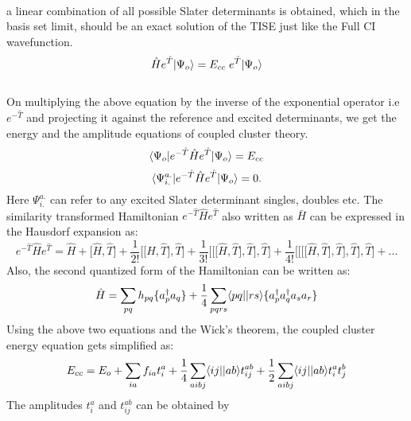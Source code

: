 \\
a linear combination of all possible Slater determinants is obtained, which in the basis set limit,  
should be an exact solution of the TISE just like the Full CI wavefunction. 
\\
\begin{equation}
\hat{H}e^{\hat{T}}| \Psi_o \rangle = E_{cc}\;e^{\hat{T}}| \Psi_o \rangle
\end{equation}
\\
On multiplying the above equation by the inverse of the exponential operator i.e
$e^{-\hat{T}}$ and projecting it against the reference and excited
determinants, we get the energy and the amplitude equations of coupled cluster
theory.
\begin {equation}
\langle \Psi_o |e^{-\hat{T}}\hat{H}e^{\hat{T}}| \Psi_o \rangle = E_{cc}
\end{equation}
\begin{equation}
\langle \Psi^{a.}_{i.} |e^{-\hat{T}}\hat{H}e^{\hat{T}}| \Psi_o \rangle = 0 .
\end{equation} 
Here $\Psi^{a.}_{i.}$ can refer to any excited Slater determinant singles, doubles etc. 
The similarity transformed Hamiltonian $e^{-\hat{T}}\hat{H}e^{\hat{T}}$ also
written as $\bar{H}$ can be expressed in the Hausdorf expansion
\cite{Merzbacher70}as:
\begin{equation}
e^{-\hat{T}}\hat{H}e^{\hat{T}} = \hat{H} + \lbrack\hat{H},\hat{T}\rbrack + \frac{1}{2!}\lbrack\lbrack\hat{H},\hat{T}\rbrack,\hat{T}\rbrack + \frac{1}{3!}\lbrack\lbrack\lbrack\hat{H},\hat{T}\rbrack,\hat{T}\rbrack,\hat{T}\rbrack + \frac{1}{4!}\lbrack\lbrack\lbrack\lbrack\hat{H},\hat{T}\rbrack,\hat{T}\rbrack,\hat{T}\rbrack,\hat{T}\rbrack + ...
\end{equation}
Also, the second quantized form of the Hamiltonian can be written as\cite{Crawford00}:
\begin{equation}
\hat{H} = \sum_{pq}h_{pq}\{a^\dagger_pa_q\} + \frac{1}{4}\sum_{pqrs}\langle pq || rs \rangle\{a^\dagger_pa^\dagger_qa_sa_r\}
\end{equation}
Using the above two equations and the Wick's theorem\cite{Wick50}, the coupled cluster energy
equation gets simplified as:
\begin{equation}
E_{cc} = E_o + \sum_{ia}f_{ia}t^a_i + \frac{1}{4}\sum_{aibj}\langle ij || ab \rangle t^{ab}_{ij} + \frac{1}{2}\sum_{aibj}\langle ij || ab \rangle t^a_it^b_j
\end{equation} The amplitudes $t^a_i$ and $t^{ab}_{ij}$ can be obtained by
